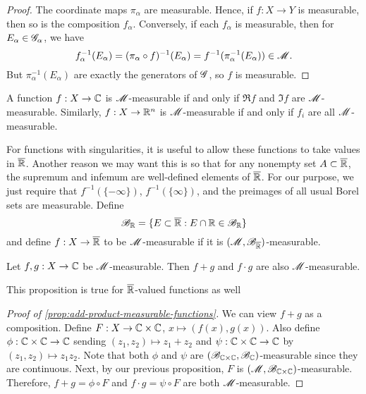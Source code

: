 \documentclass[12pt]{article} %
\begin{document}
\begin{proof}
    The coordinate maps $\pi_\alpha$ are measurable. Hence, if $f : X \to Y$ is measurable, then so is the composition $f_\alpha$. Conversely, if each $f_\alpha$ is measurable, then for $E_\alpha \in \mathscr{G}_\alpha$, we have \[f_\alpha^{-1}(E_\alpha) = (\pi_\alpha \circ f)^{-1}(E_\alpha) = f^{-1}(\pi_\alpha^{-1}(E_\alpha)) \in \mathscr{M}.\] But $\pi_\alpha^{-1}(E_\alpha)$ are exactly the generators of $\mathscr{G}$, so $f$ is measurable.
\end{proof}

\begin{corollary}
    A function $f : X \to \mathbb{C}$ is $\mathscr{M}$-measurable if and only if $\Re f$ and $\Im f$ are $\mathscr{M}$-measurable. Similarly, $f : X \to \mathbb{R}^n$ is $\mathscr{M}$-measurable if and only if $f_i$ are all $\mathscr{M}$-measurable.
\end{corollary}

For functions with singularities, it is useful to allow these functions to take values in $\overline{\mathbb{R}}$. Another reason we may want this is so that for any nonempty set $A \subset \overline{\mathbb{R}}$, the supremum and infemum are well-defined elements of $\overline{\mathbb{R}}$. For our purpose, we just require that $f^{-1}(\{-\infty\})$, $f^{-1}(\{\infty\})$, and the preimages of all usual Borel sets are measurable. Define \[\mathscr{B}_{\mathbb{R}} = \{E \subset \overline{\mathbb{R}} : E \cap \mathbb{R} \in \mathscr{B}_{\mathbb{R}}\}\] and define $f : X \to \overline{\mathbb{R}}$ to be $\mathscr{M}$-measurable if it is $(\mathscr{M}, \mathscr{B}_{\overline{\mathbb{R}}})$-measurable. 

\begin{proposition}\label{prop:add-product-measurable-functions}
    Let $f, g : X \to \mathbb{C}$ be $\mathscr{M}$-measurable. Then $f + g$ and $f\cdot g$ are also $\mathscr{M}$-measurable.
\end{proposition}

\begin{remark}
    This proposition is true for $\overline{\mathbb{R}}$-valued functions as well
\end{remark}

\begin{proof}[Proof of \cref{prop:add-product-measurable-functions}]
    We can view $f + g$ as a composition. Define $F : X \to \mathbb{C} \times \mathbb{C}$, $x \mapsto (f(x), g(x))$. Also define $\phi : \mathbb{C} \times \mathbb{C} \to \mathbb{C}$ sending $(z_1, z_2) \mapsto z_1 + z_2$ and $\psi : \mathbb{C} \times \mathbb{C} \to \mathbb{C}$ by $(z_1, z_2) \mapsto z_1 z_2$. Note that both $\phi$ and $\psi$ are $(\mathscr{B}_{\mathbb{C} \times \mathbb{C}}, \mathscr{B}_{\mathbb{C}})$-measurable since they are continuous. Next, by our previous proposition, $F$ is $(\mathscr{M}, \mathscr{B}_{\mathbb{C} \times \mathbb{C}})$-measurable. Therefore, $f + g = \phi \circ F$ and $f \cdot g = \psi \circ F$ are both $\mathscr{M}$-measurable.
\end{proof}
\end{document}
